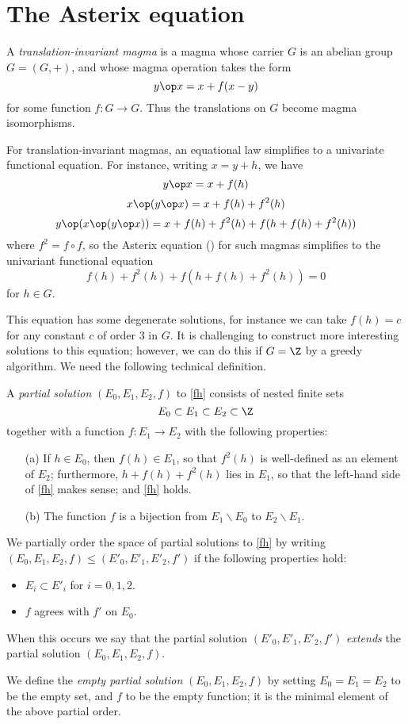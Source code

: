 \chapter{The Asterix equation}\label{asterix-chapter}

A \emph{translation-invariant magma} is a magma whose carrier $G$ is an abelian group $G = (G,+)$, and whose magma operation takes the form
$$ y \op x = x + f(x-y)$$
for some function $f: G \to G$.  Thus the translations on $G$ become magma isomorphisms.

For translation-invariant magmas, an equational law simplifies to a univariate functional equation.  For instance, writing $x = y+h$, we have
$$ y \op x = x + f(h)$$
$$ x \op (y \op x) = x + f(h) + f^2(h)$$
$$ y \op (x \op (y \op x)) = x + f(h) + f^2(h) + f( h + f(h) + f^2(h) )$$
where $f^2 = f \circ f$, so the Asterix equation () for such magmas simplifies to the univariant functional equation
\begin{equation}\label{fh}
   f(h) + f^2(h) + f( h + f(h) + f^2(h) ) = 0
\end{equation}
for $h \in G$.

This equation has some degenerate solutions, for instance we can take $f(h) = c$ for any constant $c$ of order $3$ in $G$.  It is challenging to construct more interesting solutions to this equation; however, we can do this if $G=\Z$ by a greedy algorithm.  We need the following technical definition.

\begin{definition}\label{partial-solution}  A \emph{partial solution} $(E_0, E_1, E_2, f)$ to \eqref{fh} consists of nested finite sets
$$ E_0 \subset E_1 \subset E_2 \subset \Z$$ together with a function $f: E_1 \to E_2$ with the following properties:
\begin{itemize}
  \item[(a)] If $h \in E_0$, then $f(h) \in E_1$, so that $f^2(h)$ is well-defined as an element of $E_2$; furthermore, $h + f(h) + f^2(h)$ lies in $E_1$, so that the left-hand side of \eqref{fh} makes sense; and \eqref{fh} holds.
  \item[(b)] The function $f$ is a bijection from $E_1 \backslash E_0$ to $E_2 \backslash E_1$.
\end{itemize}

We partially order the space of partial solutions to \eqref{fh} by writing $(E_0, E_1, E_2, f) \leq (E'_0, E'_1, E'_2, f')$ if the following properties hold:
\begin{itemize}
  \item $E_i \subset E'_i$ for $i=0,1,2$.
  \item $f$ agrees with $f'$ on $E_0$.
\end{itemize}
When this occurs we say that the partial solution $(E'_0, E'_1, E'_2, f')$ \emph{extends} the partial solution $(E_0, E_1, E_2, f)$.

We define the \emph{empty partial solution} $(E_0,E_1,E_2,f)$ by setting $E_0=E_1=E_2$ to be the empty set, and $f$ to be the empty function; it is the minimal element of the above partial order.
\end{definition}


